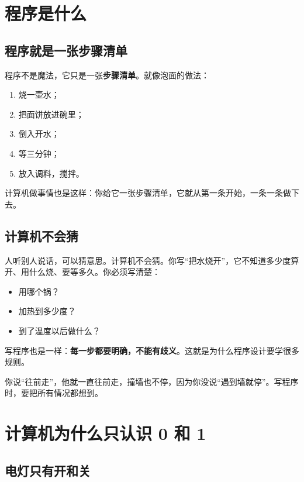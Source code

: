 \section{程序是什么}

\subsection{程序就是一张步骤清单}

程序不是魔法，它只是一张\textbf{步骤清单}。就像泡面的做法：

\begin{enumerate}
  \item 烧一壶水；
  \item 把面饼放进碗里；
  \item 倒入开水；
  \item 等三分钟；
  \item 放入调料，搅拌。
\end{enumerate}

计算机做事情也是这样：你给它一张步骤清单，它就从第一条开始，一条一条做下去。

\subsection{计算机不会猜}

人听别人说话，可以猜意思。计算机不会猜。你写“把水烧开”，它不知道多少度算开、用什么烧、要等多久。你必须写清楚：

\begin{itemize}
  \item 用哪个锅？
  \item 加热到多少度？
  \item 到了温度以后做什么？
\end{itemize}

写程序也是一样：\textbf{每一步都要明确，不能有歧义}。这就是为什么程序设计要学很多规则。

\begin{tipbox}
你说“往前走”，他就一直往前走，撞墙也不停，因为你没说“遇到墙就停”。写程序时，要把所有情况都想到。
\end{tipbox}

\section{计算机为什么只认识 0 和 1}

\subsection{电灯只有开和关}

